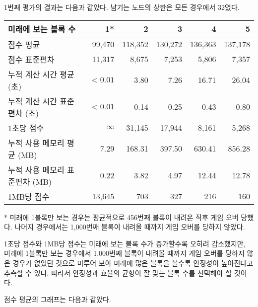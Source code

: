 1번째 평가의 결과는 다음과 같았다. 남기는 노드의 상한은 모든 경우에서 32였다.
\begin{center}
    \begin{tabular}{l|r|r|r|r|r}
        미래에 보는 블록 수 & 1* & 2 & 3 & 4 & 5 \\
        \hline
        점수 평균 & 99,470 & 118,352 & 130,272 & 136,363 & 137,178 \\
        점수 표준편차 & 11,317 & 8,675 & 7,253 & 5,806 & 7,357 \\
        \hline
        누적 계산 시간 평균 (초) & $<0.01$ & 3.80 & 7.26 & 16.71 & 26.04 \\
        누적 계산 시간 표준편차 (초) & $<0.01$ & 0.14 & 0.25 & 0.43 & 0.80 \\
        1초당 점수 & $\infty$ & 31,145 & 17,944 & 8,161 & 5,268 \\
        \hline
        누적 사용 메모리 평균 (MB) & 7.29 & 168.31 & 397.50 & 630.41 & 856.28 \\
        누적 사용 메모리 표준편차 (MB) & 0.22 & 3.82 & 4.97 & 12.44 & 12.78 \\
        1MB당 점수 & 13,645 & 703 & 327 & 216 & 160 \\
    \end{tabular}
\end{center}
* 미래에 1블록만 보는 경우는 평균적으로 456번째 블록이 내려온 직후 게임 오버 당했다.
나머지 경우에서는 1,000번째 블록이 내려올 때까지 게임 오버를 당하지 않았다.

1초당 점수와 1MB당 점수는 미래에 보는 블록 수가 증가할수록 오히려 감소했지만,
미래에 1블록만 보는 경우에서 1,000번째 블록이 내려올 때까지 게임 오버를 당하지 않은
경우가 없었던 것으로 미루어 보아 미래에 많은 블록을 볼수록 안정성이 높아진다고
추측할 수 있다. 따라서 안정성과 효율의 균형이 잘 맞는 블록 수를 선택해야 할 것이다.

점수 평균의 그래프는 다음과 같았다.

\begin{center}
\end{center}

